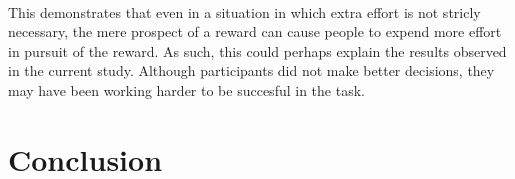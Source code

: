 \documentclass[12pt]{article}
\begin{document}
\paragraph{} This demonstrates that even in a situation in which extra effort is not stricly necessary, the mere prospect of a reward can cause people to expend more effort in pursuit of the reward. As such, this could perhaps explain the results observed in the current study. Although participants did not make better decisions, they may have been working harder to be succesful in the task. 

\section*{Conclusion}

\clearpage
\begingroup\onehalfspacing
\newpage
{}


\endgroup
\end{document}
